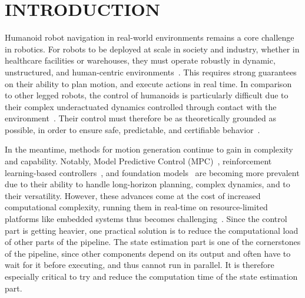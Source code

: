 \documentclass{IJCAS}
\begin{document}




\section{INTRODUCTION}


Humanoid robot navigation in real-world environments remains a core challenge in robotics. For robots to be deployed at scale in society and industry, whether in healthcare facilities or warehouses, they must operate robustly in dynamic, unstructured, and human-centric environments~\cite{Kuindersma2015OptimizationBasedLocomAtlas}. This requires strong guarantees on their ability to plan motion, and execute actions in real time. In comparison to other legged robots, the control of humanoids is particularly difficult due to their complex underactuated dynamics controlled through contact with the environment~\cite{sugihara2020surveyDynamicsHumanoids}. Their control must therefore be as theoretically grounded as possible, in order to ensure safe, predictable, and certifiable behavior~\cite{chlipala2013CertifiedProgrammingCoq}.

In the meantime, methods for motion generation continue to gain in complexity and capability. Notably, Model Predictive Control (MPC)~\cite{Katayama2023MpcLeggedHumanoid, Dantec2022WholeBodyMPCTorqueControl, Dallard2024AdiosStabilizers}, reinforcement learning-based controllers~\cite{Peters2003ReinforcmentLearningForHumanoid, Li2025RLVersatileDynamicRobustBipedalLocom}, and foundation models~\cite{Bjorck2025GrootN1, kawaharazuka2024RealWorldApplicationsFoundationModels} are becoming more prevalent due to their ability to handle long-horizon planning, complex dynamics, and to their versatility. However, these advances come at the cost of increased computational complexity, running them in real-time on resource-limited platforms like embedded systems thus becomes challenging~\cite{Zeilinger2014RealTimeRobustMPC, findeisen2004computationalDelayNMPC, Thodoroff2022BenchmarkingRealTimeRL, Firoozi2025FoundationModelsInRobotics}. Since the control part is getting heavier, one practical solution is to reduce the computational load of other parts of the pipeline. The state estimation part is one of the cornerstones of the pipeline, since other components depend on its output and often have to wait for it before executing, and thus cannot run in parallel. It is therefore especially critical to try and reduce the computation time of the state estimation part.
\end{document}
